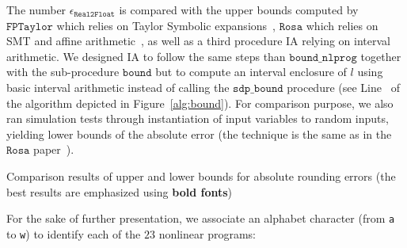 \documentclass[preprint]{sigplanconf}
\newcommand{\code}[1]{\lstinline{#1}}
\newcommand{\nbenchs}{23}
\newcommand{\sdpbound}{\mathtt{sdp\_bound}}
\newcommand{\bound}{\mathtt{bound}}
\newcommand{\boundnlprog}{\mathtt{bound\_nlprog}}
\newcommand{\realtofloat}{\mathtt{Real2Float}}
\newcommand{\rosa}{\mathtt{Rosa}}
\newcommand{\fptaylor}{\mathtt{FPTaylor}}
\theoremstyle{plain}
\begin{document}
The number $\epsilon_{\realtofloat}$ is compared with the upper bounds computed by $\fptaylor$ which relies on Taylor Symbolic expansions~\cite{fptaylor15}, $\rosa$ which relies on SMT and affine arithmetic~\cite{Darulova14Popl}, as well as a third procedure IA relying on interval arithmetic. We designed IA to follow the same steps than $\boundnlprog$ together with the sub-procedure $\bound$ but to compute an interval enclosure of $l$ using basic interval arithmetic instead of calling the $\sdpbound$ procedure (see Line~ of the algorithm depicted in Figure~\ref{alg:bound}). For comparison purpose, we also ran simulation tests through instantiation of input variables to random inputs, yielding lower bounds of the absolute error (the technique is the same as in the $\rosa$ paper~\cite{Darulova14Popl}).
%
\begin{table*}[!ht]
\begin{center}
\caption{Comparison results of upper and lower bounds for absolute rounding errors (the best results are emphasized using \textbf{bold fonts})}

\label{table:error}
\end{center}
\end{table*}
%
For the sake of further presentation, we associate an alphabet character (from \code{a} to \code{w}) to identify each of the $\nbenchs$ nonlinear programs:
%
\end{document}
